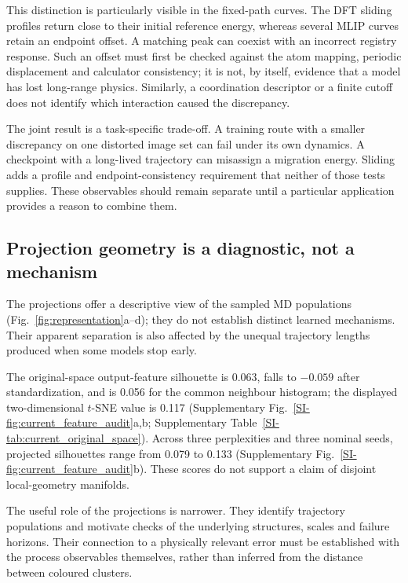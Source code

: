 \documentclass[pdflatex,sn-mathphys-num]{sn-jnl}
\newif\ifreviewcopy
\newcommand{\rev}[2]{\ifreviewcopy{\color{revisionblue}#2\textsuperscript{\scriptsize[R1-#1]}}\else#2\fi}
\begin{document}
This distinction is particularly visible in the fixed-path curves. The DFT sliding profiles return close to their initial reference energy, whereas several MLIP curves retain an endpoint offset. A matching peak can coexist with an incorrect registry response. Such an offset must first be checked against the atom mapping, periodic displacement and calculator consistency; it is not, by itself, evidence that a model has lost long-range physics. Similarly, a coordination descriptor or a finite cutoff does not identify which interaction caused the discrepancy.

The joint result is a task-specific trade-off. A training route with a smaller discrepancy on one distorted image set can fail under its own dynamics. A checkpoint with a long-lived trajectory can misassign a migration energy. Sliding adds a profile and endpoint-consistency requirement that neither of those tests supplies. These observables should remain separate until a particular application provides a reason to combine them.

\subsection{Projection geometry is a diagnostic, not a mechanism}\label{sec:representations}
The projections offer a descriptive view of the sampled MD populations (Fig.~\ref{fig:representation}a--d); \rev{A6}{they do not establish distinct learned mechanisms}. Their apparent separation is also affected by the unequal trajectory lengths produced when some models stop early.

\rev{C11}{The original-space output-feature silhouette is 0.063, falls to $-0.059$ after standardization, and is 0.056 for the common neighbour histogram; the displayed two-dimensional $t$-SNE value is 0.117 (Supplementary Fig.~\ref{SI-fig:current_feature_audit}a,b; Supplementary Table~\ref{SI-tab:current_original_space}).} Across three perplexities and three nominal seeds, projected silhouettes range from 0.079 to 0.133 (Supplementary Fig.~\ref{SI-fig:current_feature_audit}b). These scores do not support a claim of disjoint local-geometry manifolds.

The useful role of the projections is narrower. They identify trajectory populations and motivate checks of the underlying structures, scales and failure horizons. Their connection to a physically relevant error must be established with the process observables themselves, rather than inferred from the distance between coloured clusters.
\end{document}
